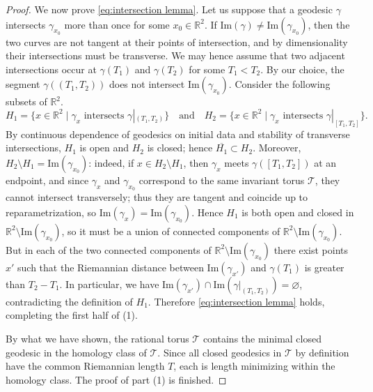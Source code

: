 \documentclass[11pt,letterpaper,oneside]{amsart}
\newcommand{\R}{\mathbb{R}}
\newcommand{\im}{\text{Im}}
\theoremstyle{definition}
\theoremstyle{remark}
\theoremstyle{definition}
\theoremstyle{remark}
\newcommand{\CT}{\mathcal{T}}
\begin{document}
\begin{proof}
    We now prove \eqref{eq:intersection lemma}. Let us suppose that a geodesic $\gamma$ intersects $\gamma_{x_0}$ more than once for some $x_0 \in \R^2$.
    If $\im(\gamma) \neq \im(\gamma_{x_0})$, then the two curves are not tangent at their points of intersection, and by dimensionality their intersections must be transverse.
    We may hence assume that two adjacent intersections occur at $\gamma(T_1)$ and $\gamma(T_2)$ for some $T_1 < T_2$. 
    By our choice, the segment $\gamma((T_1, T_2))$ does not intersect $\im(\gamma_{x_0})$.
    Consider the following subsets of $\R^2$.
    \begin{equation*}
        H_1 = \{x \in \R^2 \mid \gamma_{x} \text{ intersects } \gamma|_{(T_1, T_2)}\} \quad \text{and} \quad 
        H_2 = \{x \in \R^2 \mid \gamma_{x} \text{ intersects } \gamma|_{[T_1, T_2]}\}.
    \end{equation*}
    By continuous dependence of geodesics on initial data and stability of transverse intersections, $H_1$ is open and $H_2$ is closed; hence $\overline{H_1}\subset H_2$.
    Moreover, $H_2\setminus H_1=\im(\gamma_{x_0})$: indeed, if $x\in H_2\setminus H_1$, then $\gamma_x$ meets $\gamma([T_1, T_2])$ at an endpoint, and since $\gamma_x$ and $\gamma_{x_0}$ correspond to the same invariant torus $\CT$, they cannot intersect transversely; thus they are tangent and coincide up to reparametrization, so $\im(\gamma_x)=\im(\gamma_{x_0})$.
    Hence $H_1$ is both open and closed in $\R^2\setminus \im(\gamma_{x_0})$, so it must be a union of connected components of $\R^2\setminus \im(\gamma_{x_0})$.
    But in each of the two connected components of $\R^2\setminus \im(\gamma_{x_0})$ there exist points $x'$ such that the Riemannian distance between $\im(\gamma_{x'})$ and $\gamma(T_1)$ is greater than $T_2 - T_1$. 
    In particular, we have $\im(\gamma_{x'}) \cap \im(\gamma|_{(T_1, T_2)}) = \varnothing$, contradicting the definition of $H_1$.
    Therefore \eqref{eq:intersection lemma} holds, completing the first half of (1).

    

\medskip

    By what we have shown, the rational torus $\CT$ contains the minimal closed geodesic in the homology class of $\CT$.
    Since all closed geodesics in $\CT$ by definition have the common Riemannian length $T$, each is length minimizing within the homology class.
    The proof of part (1) is finished.

\medskip


\end{proof}
\end{document}
